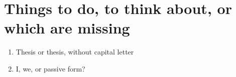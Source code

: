 
\chapter{Things to do, to think about, or which are missing}
\begin{enumerate}
\item Thesis or thesis, without capital letter
\item I, we, or passive form?
\end{enumerate}